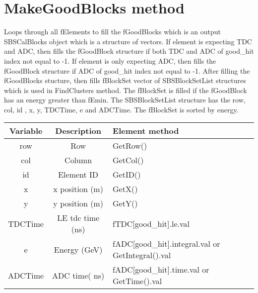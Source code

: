 \documentclass[11pt]{article}
\begin{document}
\section{MakeGoodBlocks method}
Loops through all fElements to fill the fGoodBlocks which is an
output SBSCalBlocks object which is a structure of vectors. If element is expecting TDC and ADC,
then fills the fGoodBlock structure if both TDC and ADC of good\_hit index not equal to -1.
If element is only expecting ADC, then fills the fGoodBlock structure if ADC of good\_hit index not equal to -1.
After filling the fGoodBlocks stucture, then fills fBlockSet vector of SBSBlockSetList structures which
is used in FindClusters method. The fBlockSet is filled if the fGoodBlock has an energy greater than fEmin.
The  SBSBlockSetList structure has the row, col, id , x, y, TDCTime, e and ADCTime.
The fBlockSet is sorted by energy.
\begin{table}[h]
	\begin{center}
		\begin{tabularx}{\textwidth}{|c|c|X|}
			\hline 
			Variable	& Description &  Element method\\ 
			\hline 
			row & Row & GetRow() \\
			\hline
			col & Column & GetCol() \\
			\hline	
		  id & Element ID & GetID() \\
		  \hline
		  x & x position (m) & GetX() \\
		  \hline
		  y & y position (m) & GetY() \\
		  \hline
		   TDCTime & LE tdc time (ns) & fTDC[good\_hit].le.val \\
		   \hline
		   e  & Energy (GeV) & fADC[good\_hit].integral.val or GetIntegral().val \\
		   \hline
		   ADCTime & ADC time( ns) & fADC[good\_hit].time.val or GetTime().val \\
		   \hline
\end{tabularx} 
\end{center}
\end{table}
\end{document}

